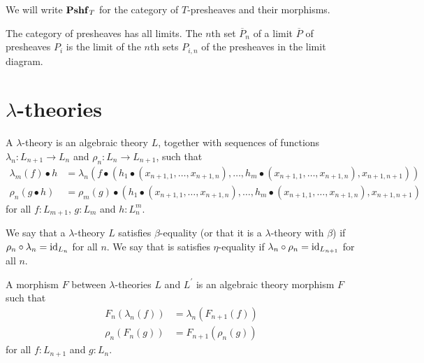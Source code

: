 We will write $ \mathbf{Pshf}_{T} $ for the category of $ T $-presheaves and their morphisms.

\begin{remark}
  The category of presheaves has all limits. The $ n $th set $ \overline{P}_n $ of a limit $ \overline{P} $ of presheaves $ P_i $ is the limit of the $ n $th sets $ P_{i, n} $ of the presheaves in the limit diagram.
\end{remark}

\section{\texorpdfstring{$ \lambda $-}{lambda-}theories}

\begin{definition}
  A $ \lambda $-theory is an algebraic theory $ L $, together with sequences of functions $ \lambda_n: L_{n + 1} \to L_n $ and $ \rho_n: L_n \to L_{n + 1} $, such that
  \begin{align*}
    \lambda_m(f) \bullet h &= \lambda_n(f \bullet (h_1 \bullet (x_{n + 1, 1}, \dots, x_{n + 1, n}), \dots, h_m \bullet (x_{n + 1, 1}, \dots, x_{n + 1, n}), x_{n + 1, n + 1}))\\
    \rho_n(g \bullet h) &= \rho_m(g) \bullet (h_1 \bullet (x_{n + 1, 1}, \dots, x_{n + 1, n}), \dots, h_m \bullet (x_{n + 1, 1}, \dots, x_{n + 1, n}), x_{n + 1, n + 1})
  \end{align*}
  for all $ f: L_{m + 1} $, $ g: L_m $ and $ h: L_n^m $.
\end{definition}

\begin{definition}
  We say that a $ \lambda $-theory $ L $ satisfies $ \beta $-equality (or that it is a $ \lambda $-theory with $ \beta $) if $ \rho_n \circ \lambda_n = \text{id}_{L_n} $ for all $ n $. We say that is satisfies $ \eta $-equality if $ \lambda_n \circ \rho_n = \text{id}_{L_{n + 1}} $ for all $ n $.
\end{definition}

\begin{definition}
  A morphism $ F $ between $ \lambda $-theories $ L $ and $ L^\prime $ is an algebraic theory morphism $ F $ such that
  \begin{align*}
    F_n(\lambda_n(f)) &= \lambda_n(F_{n + 1}(f))\\
    \rho_n(F_n(g)) &= F_{n + 1}(\rho_n(g))
  \end{align*}
  for all $ f: L_{n + 1} $ and $ g: L_n $.
\end{definition}

